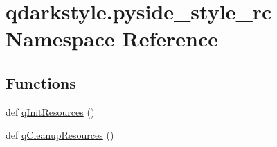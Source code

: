 \hypertarget{namespaceqdarkstyle_1_1pyside__style__rc}{}\section{qdarkstyle.\+pyside\+\_\+style\+\_\+rc Namespace Reference}
\label{namespaceqdarkstyle_1_1pyside__style__rc}
\subsection*{Functions}
\begin{DoxyCompactItemize}
\item 
def \hyperlink{namespaceqdarkstyle_1_1pyside__style__rc_a112add2f05d409ed474b496fb2ddc4d7}{q\+Init\+Resources} ()
\item 
def \hyperlink{namespaceqdarkstyle_1_1pyside__style__rc_acae20e74b6e25496043f8293eef448ba}{q\+Cleanup\+Resources} ()
\end{DoxyCompactItemize}
